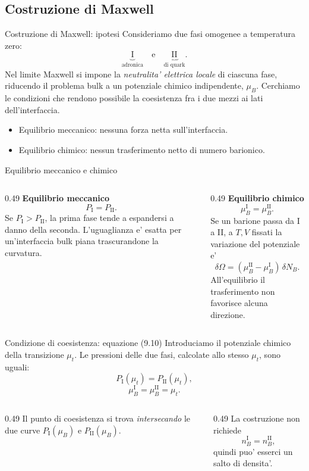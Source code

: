 \subsection{Costruzione di Maxwell}

\begin{frame}{Costruzione di Maxwell: ipotesi}
\small
Consideriamo due fasi omogenee a temperatura zero:
\[
\underbrace{\mathrm{I}}_{\text{adronica}}
\quad\text{e}\quad
\underbrace{\mathrm{II}}_{\text{di quark}}.
\]
Nel limite Maxwell si impone la \emph{neutralita' elettrica locale}
di ciascuna fase, riducendo il problema bulk a un potenziale
chimico indipendente, $\mu_B$.
\medskip
Cerchiamo le condizioni che rendono possibile la coesistenza
fra i due mezzi ai lati dell'interfaccia.
\begin{itemize}
\item Equilibrio meccanico: nessuna forza netta sull'interfaccia.
\item Equilibrio chimico: nessun trasferimento netto di numero barionico.
\end{itemize}
\end{frame}

\begin{frame}{Equilibrio meccanico e chimico}
\small
\begin{columns}[T,onlytextwidth]
\begin{column}{0.49\textwidth}
\textbf{Equilibrio meccanico}
\[
P_{\mathrm I}=P_{\mathrm{II}}.
\]
Se $P_{\mathrm I}>P_{\mathrm{II}}$, la prima fase tende a espandersi a danno della seconda.
\medskip
L'uguaglianza e' esatta per un'interfaccia bulk piana trascurandone la curvatura.
\end{column}
\begin{column}{0.49\textwidth}
\textbf{Equilibrio chimico}
\[
\mu_B^{\mathrm I}=\mu_B^{\mathrm{II}}.
\]
Se un barione passa da I a II, a $T,V$ fissati la variazione del potenziale e'
\[
\delta\Omega
=(\mu_B^{\mathrm{II}}-\mu_B^{\mathrm I})\,\delta N_B.
\]
All'equilibrio il trasferimento non favorisce alcuna direzione.
\end{column}
\end{columns}
\end{frame}

\begin{frame}{Condizione di coesistenza: equazione (9.10)}
\small
Introduciamo il potenziale chimico della transizione $\mu_t$.
Le pressioni delle due fasi, calcolate allo stesso $\mu_t$, sono uguali:
\[
P_{\mathrm I}(\mu_t)=P_{\mathrm{II}}(\mu_t),
\]
\[
\mu_B^{\mathrm I}=\mu_B^{\mathrm{II}}=\mu_t.
\]
\begin{columns}[T,onlytextwidth]
\begin{column}{0.49\textwidth}
Il punto di coesistenza si trova \emph{intersecando} le due curve $P_{\mathrm I}(\mu_B)$ e $P_{\mathrm{II}}(\mu_B)$.
\end{column}
\begin{column}{0.49\textwidth}
La costruzione non richiede
\[
n_B^{\mathrm I}=n_B^{\mathrm{II}},
\]
quindi puo' esserci un salto di densita'.
\end{column}
\end{columns}
\end{frame}


